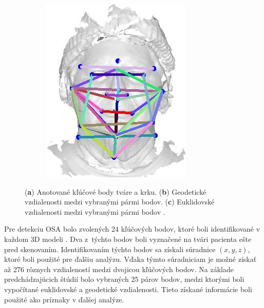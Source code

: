 \begin{figure}[h]
\begin{subfigure}[b]{0.21\textwidth}
		\includegraphics[width=\textwidth]{figures/resers_k.png}
		\caption{}
		\label{fig:resers:k}
	\end{subfigure}
	\caption{(\textbf{a}) Anotované kľúčové body tváre a krku. 
		(\textbf{b}) Geodetické vzdialenosti medzi vybranými pármi bodov.
		(\textbf{c}) Euklidovské vzdialenosti medzi vybranými pármi bodov \cite{eastwood2020predicting}. }
	\label{fig:resers:4}
\end{figure}

Pre detekciu OSA bolo zvolených 24 kľúčových bodov, ktoré boli identifikované v každom 3D modeli \cite{sutherland2016craniofacial,lee2010relationship}. 
Dva z týchto bodov boli vyznačené na tvári pacienta ešte pred skenovaním. Identifikovaním týchto bodov sa získali súradnice $(x,y,z)$, ktoré boli použité pre ďalšiu analýzu. Vďaka týmto súradniciam je možné získať až 276 rôznych vzdialeností medzi dvojicou kľúčových bodov.  Na základe predchádzajúcich štúdií bolo vybraných 25 párov bodov, medzi ktorými boli vypočítané euklidovské a geodetické vzdialenosti. Tieto získané informácie boli použité ako príznaky v ďalšej analýze. 

